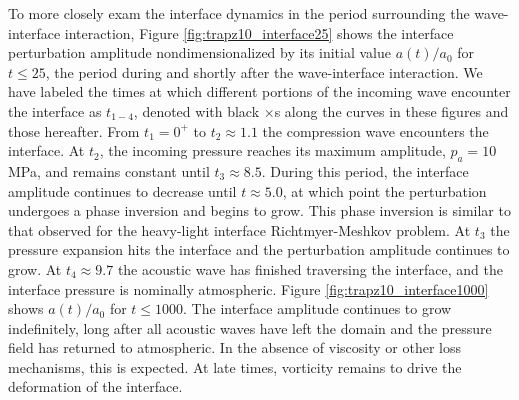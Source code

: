 \documentclass{article}
\newcommand{\bs}[1]{\boldsymbol{#1}}
\begin{document}
% 
To more closely exam the interface dynamics in the period surrounding
the wave-interface interaction, Figure \ref{fig:trapz10_interface25}
shows the interface perturbation amplitude nondimensionalized by its
initial value $a(t)/a_0$ for $t\leq25$, the period during and shortly
after the wave-interface interaction. We have labeled the times at
which different portions of the incoming wave encounter the interface
as $t_{1-4}$, denoted with black $\bs{\times}$s along the curves in
these figures and those hereafter. From $t_1=0^+$ to $t_2\approx1.1$
the compression wave encounters the interface. At $t_2$, the incoming
pressure reaches its maximum amplitude, $p_a=10$ MPa, and remains
constant until $t_3\approx8.5$. During this period, the interface
amplitude continues to decrease until $t\approx 5.0$, at which point
the perturbation undergoes a phase inversion and begins to grow. This
phase inversion is similar to that observed for the heavy-light
interface Richtmyer-Meshkov problem. At $t_3$ the pressure expansion
hits the interface and the perturbation amplitude continues to
grow. At $t_4\approx9.7$ the acoustic wave has finished traversing the
interface, and the interface pressure is nominally atmospheric. Figure
\ref{fig:trapz10_interface1000} shows $a(t)/a_0$ for $t\leq1000$. The
interface amplitude continues to grow indefinitely, long after all
acoustic waves have left the domain and the pressure field has
returned to atmospheric. In the absence of viscosity or other loss
mechanisms, this is expected. At late times, vorticity remains to
drive the deformation of the interface.
% 
% 
\end{document}
